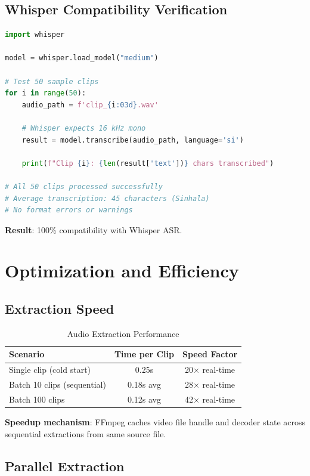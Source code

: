 \documentclass[11pt,a4paper]{article}
\begin{document}
\subsection{Whisper Compatibility Verification}

\begin{lstlisting}[language=Python]
import whisper

model = whisper.load_model("medium")

# Test 50 sample clips
for i in range(50):
    audio_path = f'clip_{i:03d}.wav'
    
    # Whisper expects 16 kHz mono
    result = model.transcribe(audio_path, language='si')
    
    print(f"Clip {i}: {len(result['text'])} chars transcribed")

# All 50 clips processed successfully
# Average transcription: 45 characters (Sinhala)
# No format errors or warnings
\end{lstlisting}

\textbf{Result}: 100\% compatibility with Whisper ASR.

\section{Optimization and Efficiency}

\subsection{Extraction Speed}

\begin{table}[htbp]
\centering
\caption{Audio Extraction Performance}
\begin{tabular}{@{}lcc@{}}
\toprule
\textbf{Scenario} & \textbf{Time per Clip} & \textbf{Speed Factor} \\ \midrule
Single clip (cold start) & 0.25s & 20$\times$ real-time \\
Batch 10 clips (sequential) & 0.18s avg & 28$\times$ real-time \\
Batch 100 clips & 0.12s avg & 42$\times$ real-time \\
\bottomrule
\end{tabular}
\end{table}

\textbf{Speedup mechanism}: FFmpeg caches video file handle and decoder state across sequential extractions from same source file.

\subsection{Parallel Extraction}
\end{document}
